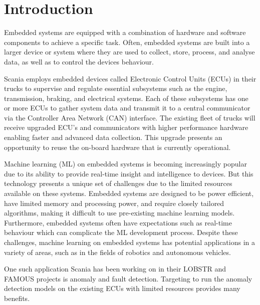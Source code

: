 \part{Introduction}

Embedded systems are equipped with a combination of hardware and software components to achieve a specific task. Often, embedded systems are built into a larger device or system where they are used to collect, store, process, and analyse data, as well as to control the device\textquotesingle s behaviour.


Scania employs embedded devices called Electronic Control Units (ECUs) in their trucks to supervise and regulate essential subsystems such as the engine, transmission, braking, and electrical systems. Each of these subsystems has one or more ECUs to gather system data and transmit it to a central communicator via the Controller Area Network (CAN) interface. The existing fleet of trucks will receive upgraded ECU's and communicators with higher performance hardware enabling faster and advanced data collection. This upgrade presents an opportunity to reuse the on-board hardware that is currently operational.

Machine learning (ML) on embedded systems is becoming increasingly popular due to its ability to provide real-time insight and intelligence to devices. But this technology presents a unique set of challenges due to the limited resources available on these systems. Embedded systems are designed to be power efficient, have limited memory and processing power, and require closely tailored algorithms, making it difficult to use pre-existing machine learning models. Furthermore, embedded systems often have expectations such as real-time behaviour which can complicate the ML development process. Despite these challenges, machine learning on embedded systems has potential applications in a variety of areas, such as in the fields of robotics and autonomous vehicles. %

One such application Scania has been working on in their \textsc{LOBSTR} \cite{lobstr} and \textsc{FAMOUS} projects is anomaly and fault detection. Targeting to run the anomaly detection models on the existing ECUs with limited resources provides many benefits.

